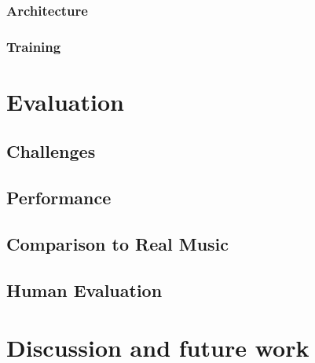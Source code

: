 \documentclass[12pt]{article}
\begin{document}
\subsubsection{Architecture}
\subsubsection{Training}

\section{Evaluation}
\subsection{Challenges}
\subsection{Performance}
\subsection{Comparison to Real Music}
\subsection{Human Evaluation}

\section{Discussion and future work}
\end{document}
